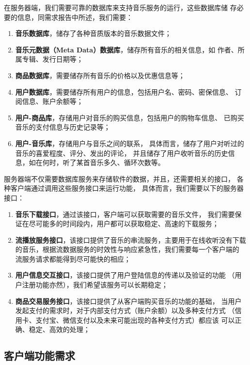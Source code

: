 在服务器端，我们需要可靠的数据库来支持音乐服务的运行，这些数据库储
存必要的信息，同需求报告中所述，我们需要：
    \begin{enumerate}
        \item \textbf{音乐数据库}，储存了各种音质版本的音乐数据文件；
        \item \textbf{音乐元数据（Meta Data）数据库}，储存所有音乐的相关信息，如
            作者、所属专辑、发行日期等；
        \item \textbf{商品数据库}，需要储存所有音乐的价格以及优惠信息等；
        \item \textbf{用户数据库}，需要储存所有用户的信息，包括用户名、密码、密保信息、
            订阅信息、账户余额等；
        \item \textbf{用户-商品库}，存储用户对音乐的购买信息，包括用户的购物车信息、
            已购买音乐的支付信息与历史记录等；
        \item \textbf{用户-音乐库}，存储用户与音乐之间的联系，
            具体而言，储存了用户对听过的音乐的喜爱程度、评分、发出的评论，
            并且储存了用户收听音乐的历史信息，如在何时，听了某首音乐多久、循环次数等。
    \end{enumerate}

服务器端不仅需要数据库服务来存储软件的数据，并且，还需要相关的接口，
各种客户端通过调用这些服务接口来运行功能，
具体而言，我们需要以下的服务器接口：
\begin{enumerate}
    \item \textbf{音乐下载接口}，通过该接口，客户端可以获取需要的音乐文件，
        我们需要保证在尽可能多的时间段内，用户都可以获取稳定、高速的下载服务；
    \item \textbf{流播放服务接口}，该接口提供了音乐的串流服务，主要用于在线收听没有下载
        的音乐，根据流数据服务的时效性与响应紧急性，我们需要每一个客户端的
        流服务请求都能得到尽可能快的相应；
    \item \textbf{用户信息交互接口}，该接口提供了用户登陆信息的传递以及验证的功能
        （用户注册功能亦然），我们希望该服务可以长期稳定；
    \item \textbf{商品交易服务接口}，该接口提供了从客户端购买音乐的功能的基础，
        当用户发起支付的需求时，对于内部支付方式（账户余额）以及多种支付方式
        （信用卡、支付宝、微信支付以及未来可能出现的各种支付方式）都应该
        可以正确、稳定、高效的处理；
\end{enumerate}

\subsection{客户端功能需求}

